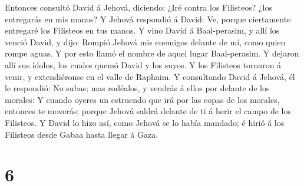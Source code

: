 Entonces consultó David á Jehová, diciendo: ¿Iré contra los Filisteos?
¿los entregarás en mis manos? Y Jehová respondió á David: Ve, porque
ciertamente entregaré los Filisteos en tus manos.  Y vino
David á Baal-perasim, y allí los venció David, y dijo: Rompió Jehová mis
enemigos delante de mí, como quien rompe aguas. Y por esto llamó el
nombre de aquel lugar Baal-perasim.  Y dejaron allí sus
ídolos, los cuales quemó David y los suyos.  Y los
Filisteos tornaron á venir, y extendiéronse en el valle de Raphaim.
 Y consultando David á Jehová, él le respondió: No subas;
mas rodéalos, y vendrás á ellos por delante de los morales:
 Y cuando oyeres un estruendo que irá por las copas de los
morales, entonces te moverás; porque Jehová saldrá delante de ti á herir
el campo de los Filisteos.  Y David lo hizo así, como
Jehová se lo había mandado; é hirió á los Filisteos desde Gabaa hasta
llegar á Gaza.

\hypertarget{section-5}{%
\section{6}\label{section-5}}

